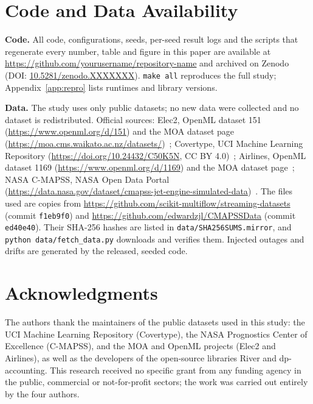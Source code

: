 \IfFileExists{IEEEtran.cls}{\documentclass[journal]{IEEEtran}\newcommand{\ieeemode}{}}{\documentclass[10pt,twocolumn,letterpaper]{article}\usepackage[margin=0.72in,columnsep=0.22in]{geometry}}
\newcommand{\RepoURL}{\url{https://github.com/yourusername/repository-name}}
\newcommand{\ZenodoDOI}{\href{https://doi.org/10.5281/zenodo.XXXXXXX}{10.5281/zenodo.XXXXXXX}}
\begin{document}
\section*{Code and Data Availability}
\noindent\textbf{Code.} All code, configurations, seeds, per-seed result logs and the scripts that regenerate every number, table and figure in this paper are available at \RepoURL{} and archived on Zenodo (DOI: \ZenodoDOI). \texttt{make all} reproduces the full study; Appendix~\ref{app:repro} lists runtimes and library versions.

\noindent\textbf{Data.} The study uses only public datasets; no new data were collected and no dataset is redistributed. Official sources: Elec2, OpenML dataset 151 (\url{https://www.openml.org/d/151}) and the MOA dataset page (\url{https://moa.cms.waikato.ac.nz/datasets/})~\cite{harries1999elec,openml151,moadatasets}; Covertype, UCI Machine Learning Repository (\url{https://doi.org/10.24432/C50K5N}, CC BY 4.0)~\cite{blackard2000covtype,ucicovtype}; Airlines, OpenML dataset 1169 (\url{https://www.openml.org/d/1169}) and the MOA dataset page~\cite{ikonomovska2011fimt,openml1169,moadatasets}; NASA C-MAPSS, NASA Open Data Portal (\url{https://data.nasa.gov/dataset/cmapss-jet-engine-simulated-data})~\cite{saxena2008cmapss,nasacmapss}. The files used are copies from \url{https://github.com/scikit-multiflow/streaming-datasets} (commit \texttt{f1eb9f0}) and \url{https://github.com/edwardzjl/CMAPSSData} (commit \texttt{ed40e40}). Their SHA-256 hashes are listed in \texttt{data/SHA256SUMS.mirror}, and \texttt{python data/fetch\_data.py} downloads and verifies them. Injected outages and drifts are generated by the released, seeded code.

\section*{Acknowledgments}
The authors thank the maintainers of the public datasets used in this study: the UCI Machine Learning Repository (Covertype), the NASA Prognostics Center of Excellence (C-MAPSS), and the MOA and OpenML projects (Elec2 and Airlines), as well as the developers of the open-source libraries River and dp-accounting. This research received no specific grant from any funding agency in the public, commercial or not-for-profit sectors; the work was carried out entirely by the four authors.


\ifdefined\ieeemode\else{\small}\fi %

\appendix

\end{document}
